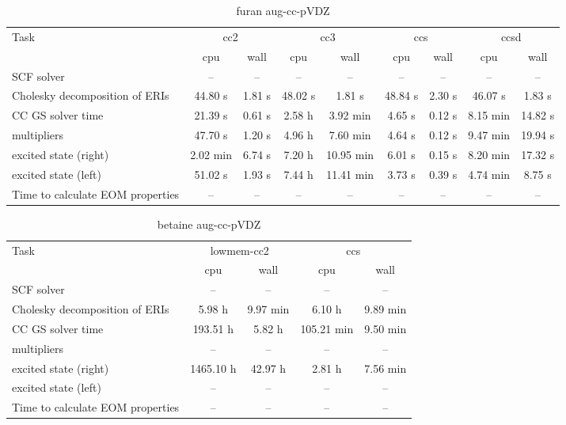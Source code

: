 \documentclass{article}
\begin{document}
\begin{table}
\caption{furan aug-cc-pVDZ}
\begin{tabular}{lcccccccc}
\toprule
Task & \multicolumn{2}{c}{cc2} & \multicolumn{2}{c}{cc3} & \multicolumn{2}{c}{ccs} & \multicolumn{2}{c}{ccsd}\\
\cmidrule(lr){2-3}\cmidrule(lr){4-5}\cmidrule(lr){6-7}\cmidrule(lr){8-9}
 & cpu & wall & cpu & wall & cpu & wall & cpu & wall\\
\midrule
SCF solver & -- & -- & -- & -- & -- & -- & -- & --\\
Cholesky decomposition of ERIs & 44.80 s & 1.81 s & 48.02 s & 1.81 s & 48.84 s & 2.30 s & 46.07 s & 1.83 s\\
CC GS solver time & 21.39 s & 0.61 s & 2.58 h & 3.92 min & 4.65 s & 0.12 s & 8.15 min & 14.82 s\\
multipliers & 47.70 s & 1.20 s & 4.96 h & 7.60 min & 4.64 s & 0.12 s & 9.47 min & 19.94 s\\
excited state (right) & 2.02 min & 6.74 s & 7.20 h & 10.95 min & 6.01 s & 0.15 s & 8.20 min & 17.32 s\\
excited state (left) & 51.02 s & 1.93 s & 7.44 h & 11.41 min & 3.73 s & 0.39 s & 4.74 min & 8.75 s\\
Time to calculate EOM properties & -- & -- & -- & -- & -- & -- & -- & --\\
\bottomrule
\end{tabular}
\end{table}
\begin{table}
\caption{betaine aug-cc-pVDZ}
\begin{tabular}{lcccc}
\toprule
Task & \multicolumn{2}{c}{lowmem-cc2} & \multicolumn{2}{c}{ccs}\\
\cmidrule(lr){2-3}\cmidrule(lr){4-5}
 & cpu & wall & cpu & wall\\
\midrule
SCF solver & -- & -- & -- & --\\
Cholesky decomposition of ERIs & 5.98 h & 9.97 min & 6.10 h & 9.89 min\\
CC GS solver time & 193.51 h & 5.82 h & 105.21 min & 9.50 min\\
multipliers & -- & -- & -- & --\\
excited state (right) & 1465.10 h & 42.97 h & 2.81 h & 7.56 min\\
excited state (left) & -- & -- & -- & --\\
Time to calculate EOM properties & -- & -- & -- & --\\
\bottomrule
\end{tabular}
\end{table}
\end{document}
